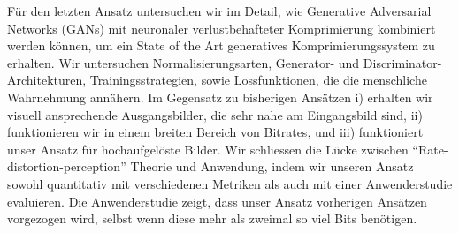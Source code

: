 Für den letzten Ansatz untersuchen wir im Detail, wie Generative Adversarial
Networks (GANs) mit neuronaler verlustbehafteter Komprimierung kombiniert
werden können, um ein State of the Art generatives Komprimierungssystem zu
erhalten. Wir untersuchen Normalisierungsarten, Generator- und
Discriminator-Architekturen, Trainingsstrategien, sowie Lossfunktionen, die die
menschliche Wahrnehmung annähern. Im Gegensatz zu bisherigen Ansätzen i)
erhalten wir visuell ansprechende Ausgangsbilder, die sehr nahe am Eingangsbild
sind, ii) funktionieren wir in einem breiten Bereich von Bitrates, und iii)
funktioniert unser Ansatz für hochaufgelöste Bilder. Wir schliessen die Lücke
zwischen ``Rate-distortion-perception'' Theorie und Anwendung, indem wir
unseren Ansatz sowohl quantitativ mit verschiedenen Metriken als auch mit einer
Anwenderstudie evaluieren. Die Anwenderstudie zeigt, dass unser Ansatz
vorherigen Ansätzen vorgezogen wird, selbst wenn diese mehr als zweimal so viel
Bits benötigen.



\endgroup

\vfill
